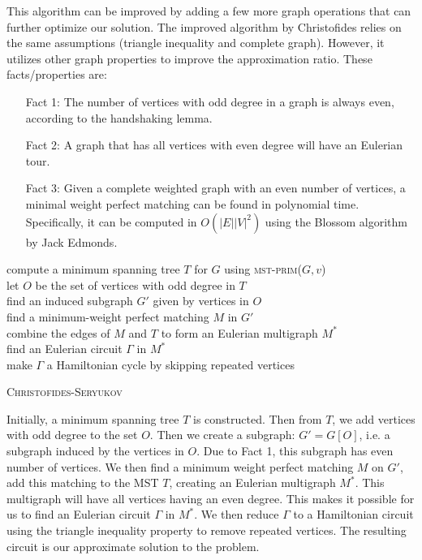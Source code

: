 \documentclass[11pt]{article}
\begin{document}
  This algorithm can be improved by adding a few more graph operations that can further optimize our solution.
  The improved algorithm by Christofides relies on the same assumptions (triangle inequality and complete graph). 
  However, it utilizes other graph properties to improve the approximation ratio. These facts/properties are:
  \begin{enumerate}
    \item[Fact 1:] The number of vertices with odd degree in a graph is always even, according to the handshaking lemma. 
    \item[Fact 2:] A graph that has all vertices with even degree will have an Eulerian tour. 
    \item[Fact 3:] Given a complete weighted graph with an even number of vertices, a minimal weight perfect matching can be found in polynomial 
     time. Specifically, it can be computed in $O(|E||V|^2)$  using the Blossom algorithm by Jack Edmonds.
  \end{enumerate} 
  \begin{algorithm*}
    compute a minimum spanning tree $T$ for $G$ using \textsc{mst-prim}($G, v$) \\
    let $O$ be the set of vertices with odd degree in $T$ \\
    find an induced subgraph $G'$ given by vertices in $O$ \\
    find a minimum-weight perfect matching $M$ in $G'$ \\
    combine the edges of $M$ and $T$ to form an Eulerian multigraph $M^*$ \\
    find an Eulerian circuit $\Gamma$ in $M^*$ \\
    make $\Gamma$ a Hamiltonian cycle by skipping repeated vertices \\
    \caption{\textsc{Christofides-Seryukov}}
\end{algorithm*}
  
  Initially, a minimum spanning tree $T$ is constructed. Then from $T$, we add vertices with odd degree to the set $O$. 
  Then we create a subgraph: $G' = G[O]$, i.e. a subgraph induced by the vertices in $O$. Due to Fact 1, this subgraph has 
  even number of vertices. We then find a minimum weight perfect matching $M$ on $G'$, add this matching to the MST $T$, creating 
  an Eulerian multigraph $M^*$. This multigraph will have all vertices having an even degree. This makes it possible for us 
  to find an Eulerian circuit $\Gamma$ in $M^*$. We then reduce $\Gamma$ to a Hamiltonian circuit using the triangle inequality 
  property to remove repeated vertices. The resulting circuit is our approximate solution to the problem. 
\end{document}
